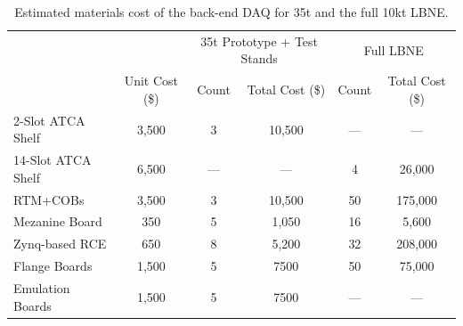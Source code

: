 \begin{table}[tbh]
\begin{center}
\begin{tabular}{|l|c|cc|cc|}   
\hline \hline 
						 			 &         & \multicolumn{2}{|c|}{35t  Prototype + Test Stands} &\multicolumn{2}{|c|}{Full LBNE }    \\      
									 & Unit Cost (\$)& Count &  Total Cost (\$) & Count &  Total Cost  (\$)\\      
\hline
   2-Slot ATCA Shelf    & 3,500              &  3         &    10,500     &  ---  &  ---  \\ 
  14-Slot ATCA Shelf   & 6,500              &  ---         &    ---    &  4  &  26,000  \\ 
     RTM+COBs             & 3,500              &  3         &    10,500     &    50   &   175,000\\ 
   Mezanine Board     & 350                &  5         &       1,050    &  16   &  5,600 \\ 
   Zynq-based RCE	   & 650                &  8          &   5,200        &   32    &208,000\\ 
   Flange Boards          & 1,500              &  5          &  7500        & 50          & 75,000\\ 
   Emulation Boards     & 1,500              &  5          &  7500        &  ---        &    ---  \\ 
\hline \hline
\end{tabular}
\caption[]{Estimated materials cost of the back-end DAQ for 35t and the full 10kt LBNE.}
\label{tab:mats} 
\end{center}
\end{table}

